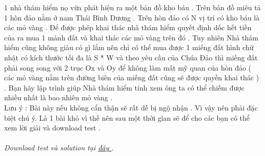 1 nhà thám hiểm nọ vừa phát hiện ra một bản đồ kho báu . Trên bản đồ miêu tả 1 hòn đảo  nằm ở nam Thái Bình Dương . Trên hòn đảo có N vị trí có kho báu là các mỏ vàng . Để được phép khai thác nhà thám hiểm quyết định dốc hết tiền của ra mua 1 mảnh đất và khai thác các mỏ vàng trên đó . Tuy nhiên Nhà thám hiểm cũng không giàu có gì lắm nên chỉ có thể mua được 1 miếng đất hình chữ nhật có kích thước tối đa là S * W và theo yêu cầu của Chúa Đảo thì miếng đất phải song song với 2 trục Ox và Oy để không làm mất mỹ quan của hòn đảo ( các mỏ vàng nằm trên đường biên của miếng đất cũng sẽ được quyền khai thác ) . Bạn hãy lập trình giúp Nhà thám hiểm tính xem ông ta có thể chiếm được nhiều nhất là bao nhiêu mỏ vàng .   
\\       Lưu ý : Bài này nếu không cẩn thận sẽ rất dễ bị ngộ nhận . Vì vậy nên phải đặc biệt chú ý. Là 1 bài khó vì thế nên sau một thời gian sẽ để cho các bạn có thể xem lời giải và download test .      
\\
\\\textit{    Download test và solution tại    \href{http://vn.spoj.pl/content/GOLD.rar}{     đây    }    .   }